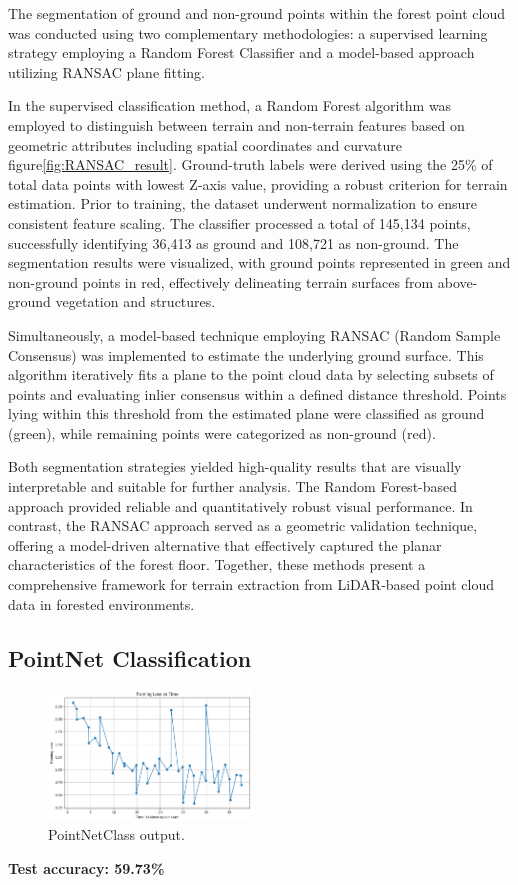 \documentclass[../report.tex]{subfiles}
\begin{document}
    The segmentation of ground and non-ground points within the forest point cloud was conducted using two complementary methodologies: a supervised learning strategy employing a Random Forest Classifier and a model-based approach utilizing RANSAC plane fitting.
    
    In the supervised classification method, a Random Forest algorithm was employed to distinguish between terrain and non-terrain features based on geometric attributes including spatial coordinates and curvature figure\ref{fig:RANSAC_result}. Ground-truth labels were derived using the 25\% of total data points with lowest Z-axis value, providing a robust criterion for terrain estimation. Prior to training, the dataset underwent normalization to ensure consistent feature scaling. The classifier processed a total of 145,134 points, successfully identifying 36,413 as ground and 108,721 as non-ground. The segmentation results were visualized, with ground points represented in green and non-ground points in red, effectively delineating terrain surfaces from above-ground vegetation and structures.
    
    Simultaneously, a model-based technique employing RANSAC (Random Sample Consensus) was implemented to estimate the underlying ground surface. This algorithm iteratively fits a plane to the point cloud data by selecting subsets of points and evaluating inlier consensus within a defined distance threshold. Points lying within this threshold from the estimated plane were classified as ground (green), while remaining points were categorized as non-ground (red).
    
    Both segmentation strategies yielded high-quality results that are visually interpretable and suitable for further analysis. The Random Forest-based approach provided reliable and quantitatively robust visual performance. In contrast, the RANSAC approach served as a geometric validation technique, offering a model-driven alternative that effectively captured the planar characteristics of the forest floor. Together, these methods present a comprehensive framework for terrain extraction from LiDAR-based point cloud data in forested environments.
    
\subsection{PointNet Classification}
\begin{figure}[H]
    \centering
    \includegraphics[width=0.48\textwidth]{rnd-project-report-main/figures/PointNetClass.png}
    \caption{PointNetClass output.}
    \label{pointnet_classification}
\end{figure}
        \noindent\textbf{Test accuracy:  59.73\%}
    
\end{document}
